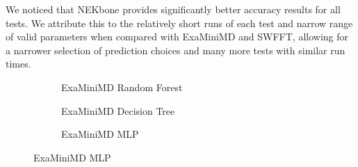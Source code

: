 \documentclass[conference, 10pt, onecolumn, draftclsnofoot]{IEEEtran}
\begin{document}
We noticed that NEKbone provides significantly better accuracy results for all tests.
We attribute this to the relatively short runs of each test and narrow range of valid parameters when compared with ExaMiniMD and SWFFT, allowing for a narrower selection of prediction choices and many more tests with similar run times.

\begin{figure}
     \centering
     \begin{subfigure}[t]{0.3\textwidth}
         \centering
         
         \caption{ExaMiniMD Random Forest}
         \label{fig:ExaMiniMDRFR}
     \end{subfigure}
     \hfill
     \begin{subfigure}[t]{0.3\textwidth}
         \centering
         
         \caption{ExaMiniMD Decision Tree}
         \label{fig:ExaMiniMDDTR}
     \end{subfigure}
     \hfill
     \begin{subfigure}[t]{0.3\textwidth}
         \centering
         
         \caption{ExaMiniMD MLP}
         \label{fig:ExaMiniMDMLP}
     \end{subfigure}
    

\end{figure}
\end{document}
